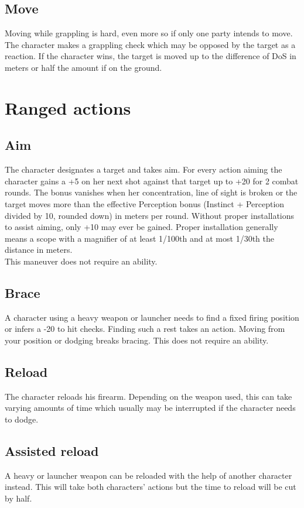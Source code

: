 \documentclass[12pt,a4paper,openany]{book}
\begin{document}
	\subsection*{Move}
	Moving while grappling is hard, even more so if only one party intends to move.\\
	The character makes a grappling check which may be opposed by the target as a reaction. If the character wins, the target is moved up to the difference of DoS in meters or half the amount if on the ground.
	\section{Ranged actions}
	\subsection*{Aim}
	The character designates a target and takes aim. For every action aiming the character gains a +5 on her next shot against that target up to +20 for 2 combat rounds. The bonus vanishes when her concentration, line of sight is broken or the target moves more than the effective Perception bonus (Instinct + Perception divided by 10, rounded down) in meters per round. Without proper installations to assist aiming, only +10 may ever be gained. Proper installation generally means a scope with a magnifier of at least 1/100th and at most 1/30th the distance in meters.\\
	This maneuver does not require an ability.
	\subsection*{Brace}
	A character using a heavy weapon or launcher needs to find a fixed firing position or infers a -20 to hit checks. Finding such a rest takes an action. Moving from your position or dodging breaks bracing. This does not require an ability.
	\subsection*{Reload}
	The character reloads his firearm. Depending on the weapon used, this can take varying amounts of time which usually may be interrupted if the character needs to dodge.
	\subsection*{Assisted reload}
	A heavy or launcher weapon can be reloaded with the help of another character instead. This will take both characters’ actions but the time to reload will be cut by half.
\end{document}
